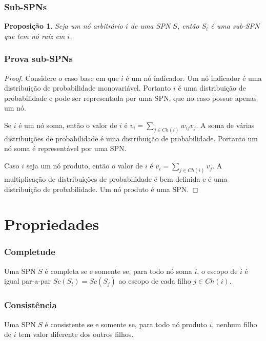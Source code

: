 \documentclass[10pt]{beamer}
\theoremstyle{plain}
\newtheorem{proposition}{Proposição}
\begin{document}
\begin{frame}
  \frametitle{Sub-SPNs}
  \begin{proposition}
    Seja um nó arbitrário $i$ de uma SPN $S$, então $S_i$ é uma sub-SPN que tem nó raíz em $i$.
  \end{proposition}
\end{frame}

\begin{frame}
  \frametitle{Prova sub-SPNs}
  \begin{proof}
    Considere o caso base em que $i$ é um nó indicador. Um nó indicador é uma distribuição de
    probabilidade monovariável. Portanto $i$ é uma distribuição de probabilidade e pode ser
    representada por uma SPN, que no caso possue apenas um nó.

    Se $i$ é um nó soma, então o valor de $i$ é $v_i=\sum_{j\in Ch(i)} w_{ij}v_j$. A soma de várias
    distribuições de probabilidade é uma distribuição de probabilidade. Portanto um nó soma é
    representável por uma SPN\@.

    Caso $i$ seja um nó produto, então o valor de $i$ é $v_i=\sum_{j\in Ch(i)} v_j$. A multiplicação
    de distribuições de probabilidade é bem definida e é uma distribuição de probabilidade. Um nó
    produto é uma SPN\@.
  \end{proof}
\end{frame}


\section{Propriedades}

\begin{frame}
  \frametitle{Completude}
  \begin{definition}[Completude]
    Uma SPN $S$ é completa se e somente se, para todo nó soma $i$, o escopo de $i$ é igual par-a-par
    $Sc(S_i)=Sc(S_j)$ ao escopo de cada filho $j\in Ch(i)$.
  \end{definition}
\end{frame}

\begin{frame}
  \frametitle{Consistência}
  \begin{definition}[Consistência]
    Uma SPN $S$ é consistente se e somente se, para todo nó produto $i$, nenhum filho de $i$ tem
    valor diferente dos outros filhos.
  \end{definition}
\end{frame}
\end{document}
